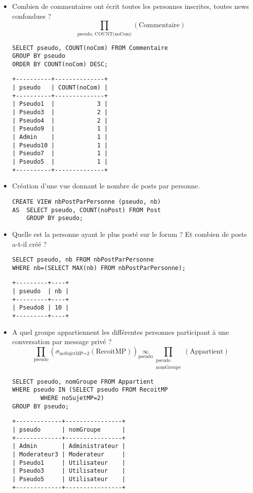\begin{itemize}
	\item Combien de commentaires ont écrit toutes les personnes inscrites, toutes news confondues ?
	\[\prod_{\text{pseudo, COUNT(noCom)}}\left(\text{Commentaire}\right)\]
	\begin{verbatim}
SELECT pseudo, COUNT(noCom) FROM Commentaire
GROUP BY pseudo
ORDER BY COUNT(noCom) DESC;
	\end{verbatim}
\begin{verbatim}
+----------+--------------+
| pseudo   | COUNT(noCom) |
+----------+--------------+
| Pseudo1  |            3 |
| Pseudo3  |            2 |
| Pseudo4  |            2 |
| Pseudo9  |            1 |
| Admin    |            1 |
| Pseudo10 |            1 |
| Pseudo7  |            1 |
| Pseudo5  |            1 |
+----------+--------------+
\end{verbatim}

	\item Création d'une vue donnant le nombre de posts par personne.
\begin{verbatim}
CREATE VIEW nbPostParPersonne (pseudo, nb)
AS	SELECT pseudo, COUNT(noPost) FROM Post
	GROUP BY pseudo;
\end{verbatim}

	\item Quelle est la personne ayant le plus posté sur le forum ? Et combien de posts a-t-il créé ?
\begin{verbatim}
SELECT pseudo, nb FROM nbPostParPersonne
WHERE nb=(SELECT MAX(nb) FROM nbPostParPersonne);
\end{verbatim}
\begin{verbatim}
+---------+----+
| pseudo  | nb |
+---------+----+
| Pseudo8 | 10 |
+---------+----+
\end{verbatim}
	\item A quel groupe appartiennent les différentes personnes participant à une conversation par message privé ?
	\[\prod_{\text{pseudo}}\left( \sigma_{\text{noSujetMP=2}}(\text{RecoitMP})\right)\underset{\text{pseudo}}{\infty}\prod_{\begin{array}{c} \text{pseudo}\\\text{nomGroupe}\end{array}}(\text{Appartient})\]
	\begin{verbatim}
SELECT pseudo, nomGroupe FROM Appartient
WHERE pseudo IN (SELECT pseudo FROM RecoitMP
		WHERE noSujetMP=2)
GROUP BY pseudo;
	\end{verbatim}
\begin{verbatim}
+-------------+----------------+
| pseudo      | nomGroupe      |
+-------------+----------------+
| Admin       | Administrateur |
| Moderateur3 | Moderateur     |
| Pseudo1     | Utilisateur    |
| Pseudo3     | Utilisateur    |
| Pseudo5     | Utilisateur    |
+-------------+----------------+
\end{verbatim}


\end{itemize}
